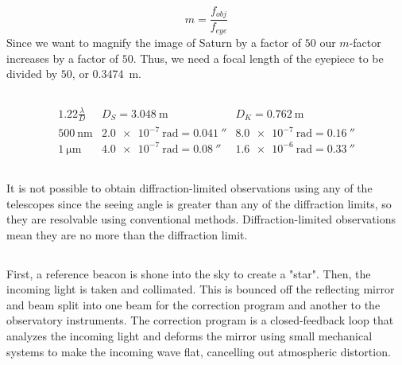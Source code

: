 \documentclass{article}
\begin{document}
\begin{equation}
    m = \frac{f_{obj}}{f_{eye}}
\end{equation}
Since we want to magnify the image of Saturn by a factor of \(50\) our \(m\)-factor increases by a factor of \(50\).
Thus, we need a focal length of the eyepiece to be divided by \(50\), or \SI{0.3474}{\meter}.

\subsection{}

\begin{equation}
    \begin{array}{c|c|c}
        1.22 \frac{\lambda}{D} & D_S = \SI{3.048}{\meter} & D_K = \SI{0.762}{\meter} \\
        \hline
        \SI{500}{\nano\meter} & \SI{2.0e-7}{\radian} = \SI{0.041}{\arcsecond} & \SI{8.0e-7}{\radian} = \SI{0.16}{\arcsecond} \\
        \hline
        \SI{1}{\micro\meter} & \SI{4.0e-7}{\radian} = \SI{0.08}{\arcsecond} & \SI{1.6e-6}{\radian} = \SI{0.33}{\arcsecond}
    \end{array}
\end{equation}

\subsection{}

It is not possible to obtain diffraction-limited observations using any of the telescopes since the seeing angle is greater than any of the diffraction limits, so they are resolvable using conventional methods.
Diffraction-limited observations mean they are no more than the diffraction limit.

\subsection{}

First, a reference beacon is shone into the sky to create a "star".
Then, the incoming light is taken and collimated.
This is bounced off the reflecting mirror and beam split into one beam for the correction program and another to the observatory instruments.
The correction program is a closed-feedback loop that analyzes the incoming light and deforms the mirror using small mechanical systems to make the incoming wave flat, cancelling out atmospheric distortion.
\end{document}
